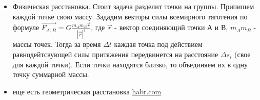\begin {itemize}
\begin{figure}[h!]
\begin{minipage}[h]{0.49\linewidth}
\end{minipage}
\hfill
\begin{minipage}[h]{0.49\linewidth}
\end{minipage}
\end{figure}

\item  Физическая расстановка.
Стоит задача разделит точки на группы. Припишем каждой точке свою массу. Зададим векторы силы всемирного тяготения по формуле 
$\vec{F_{A,B}} = G \frac{m_{A} m_{B}\vec{r}}{|\vec{r}|^3}$, где $\vec{r}$ - вектор соединяющий точки А и В, $m_{A} m_{B}$ - массы точек. Тогда за время $\Delta t$ каждая точка под действием равнодейтсвующей силы притяжения передвинется на расстояние $\Delta s_i$ (свое для каждой точки). Если точки находятся близко, то объединяем их в одну точку суммарной массы. 

\item еще есть геометрическая расстановка \href{https://habr.com/ru/post/101338/}{habr.com}
\end{itemize} 



